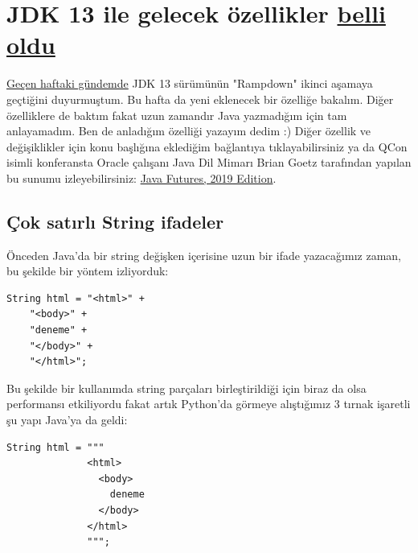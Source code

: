 \documentclass[11pt]{article}
\begin{document}
\section{JDK 13 ile gelecek özellikler \href{https://www.javaworld.com/article/3341388/jdk-13-the-new-features-coming-to-java-13.html}{belli oldu}}
\label{sec:orgda286ab}
\href{../02/yazilim-gundemi-02.pdf}{Geçen haftaki gündemde} JDK 13 sürümünün "Rampdown" ikinci aşamaya geçtiğini
duyurmuştum. Bu hafta da yeni eklenecek bir özelliğe bakalım. Diğer özelliklere
de baktım fakat uzun zamandır Java yazmadığım için tam anlayamadım. Ben de
anladığım özelliği yazayım dedim :) Diğer özellik ve değişiklikler için konu
başlığına eklediğim bağlantıya tıklayabilirsiniz ya da QCon isimli konferansta
Oracle çalışanı Java Dil Mimarı Brian Goetz tarafından yapılan bu sunumu
izleyebilirsiniz: \href{https://www.infoq.com/presentations/java-futures-2019/}{Java Futures, 2019 Edition}.

\subsection{Çok satırlı String ifadeler}
\label{sec:org5a73d0d}
Önceden Java'da bir string değişken içerisine uzun bir ifade yazacağımız
zaman, bu şekilde bir yöntem izliyorduk:

\begin{verbatim}
String html = "<html>" +
    "<body>" +
    "deneme" +
    "</body>" +
    "</html>";
\end{verbatim}
Bu şekilde bir kullanımda string parçaları birleştirildiği için biraz da olsa
performansı etkiliyordu fakat artık Python'da görmeye alıştığımız 3 tırnak
işaretli şu yapı Java'ya da geldi:

\begin{verbatim}
String html = """
              <html>
                <body>
                  deneme
                </body>
              </html>
              """;
\end{verbatim}
\end{document}
